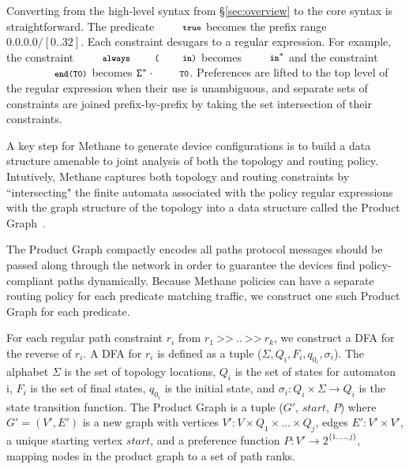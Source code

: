 \documentclass[numbers, 10pt, preprint]{sigplanconf}
\newcommand{\sysname}{{\small \sf Methane}\xspace}
\newcommand{\set}[1]{\ensuremath{\{ #1 \} }}
\newcommand{\CD}[1]{\texttt{\small #1}}  %
\newcommand{\KW}[1]{\texttt{\small\bfseries{#1}}}
\newcommand{\True}{\CD{true}}
\newcommand{\Prefer}{\texttt{>>}}
\newcommand{\Path}{\texttt{=>}}
\newcommand{\In}{\KW{in}}
\newcommand{\Exit}{\KW{exit}}
\newcommand{\End}{\KW{end}}
\newcommand{\Always}{\KW{always}}
\begin{document}
Converting from the high-level syntax from \S\ref{sec:overview} to the core syntax is straightforward. The predicate $\True$ becomes the prefix range $0.0.0.0/[0..32]$.
%
Each constraint desugars to a regular expression. For example, the constraint $\Always\CD{(\In)}$ becomes $\In^*$ and the constraint $\CD{\End(T0)}$ becomes $\mathtt{\Sigma}^* \cdot \CD{T0}$.
%
Preferences are lifted to the top level of the regular expression when their use is unambiguous, and separate sets of constraints are joined prefix-by-prefix by taking the set intersection of their constraints.

%
%

A key step for \sysname to generate device configurations is to build a data structure amenable to joint analysis of both the topology and routing policy. Intutively, \sysname captures both topology and routing constraints by ``intersecting" the finite automata associated with the policy regular expressions with the graph structure of the topology into a data structure called the Product Graph~\cite{propane}.

The Product Graph compactly encodes all paths protocol messages should be passed along through the network in order to guarantee the devices find policy-compliant paths dynamically.
%
%
Because \sysname policies can have a separate routing policy for each predicate matching traffic, we construct one such Product Graph for each predicate.


For each regular path constraint $r_i$ from $r_1 ~\Prefer~ .. ~\Prefer~ r_k$, we construct a DFA for the reverse of $r_i$. A DFA for $r_i$ is defined as a tuple ($\Sigma, Q_i, F_i, q_{0_i}, \sigma_i$). The alphabet $\Sigma$ is the set of topology locations, $Q_i$ is the set of states for automaton i, $F_i$ is the set of final states, $q_{0_i}$ is the initial state, and $\sigma_i \colon Q_i \times \Sigma \rightarrow Q_i$ is the state transition function.
%
The Product Graph is a tuple ($G'$, $start$, $P$) where $G' = (V',E')$ is a new graph with
vertices $V' \colon V \times Q_1 \times \dots \times Q_j$,
edges $E' \colon V' \times V'$,
a unique starting vertex $start$,
and a preference function $P \colon V' \rightarrow 2^{\set{1, \dots, j}}$, mapping nodes in the product graph to a set of path ranks.
\end{document}
